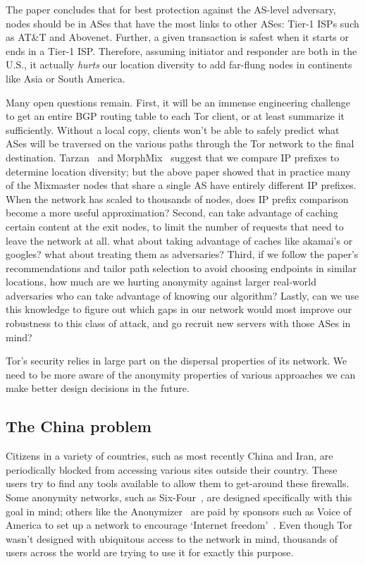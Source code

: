 \documentclass{llncs}
\begin{document}
The paper concludes that for best protection against the AS-level
adversary, nodes should be in ASes that have the most links to other ASes:
Tier-1 ISPs such as AT\&T and Abovenet. Further, a given transaction
is safest when it starts or ends in a Tier-1 ISP. Therefore, assuming
initiator and responder are both in the U.S., it actually \emph{hurts}
our location diversity to add far-flung nodes in continents like Asia
or South America.

Many open questions remain. First, it will be an immense engineering
challenge to get an entire BGP routing table to each Tor client, or at
least summarize it sufficiently. Without a local copy, clients won't be
able to safely predict what ASes will be traversed on the various paths
through the Tor network to the final destination. Tarzan~\cite{tarzan:ccs02}
and MorphMix~\cite{morphmix:fc04} suggest that we compare IP prefixes to
determine location diversity; but the above paper showed that in practice
many of the Mixmaster nodes that share a single AS have entirely different
IP prefixes. When the network has scaled to thousands of nodes, does IP
prefix comparison become a more useful approximation?
%
Second, can take advantage of caching certain content at the exit nodes, to
limit the number of requests that need to leave the network at all.
what about taking advantage of caches like akamai's or googles? what
about treating them as adversaries?
%
Third, if we follow the paper's recommendations and tailor path selection
to avoid choosing endpoints in similar locations, how much are we hurting
anonymity against larger real-world adversaries who can take advantage
of knowing our algorithm?
%
Lastly, can we use this knowledge to figure out which gaps in our network
would most improve our robustness to this class of attack, and go recruit
new servers with those ASes in mind?

Tor's security relies in large part on the dispersal properties of its
network. We need to be more aware of the anonymity properties of various
approaches we can make better design decisions in the future.

\subsection{The China problem}
\label{subsec:china}

Citizens in a variety of countries, such as most recently China and
Iran, are periodically blocked from accessing various sites outside
their country. These users try to find any tools available to allow
them to get-around these firewalls. Some anonymity networks, such as
Six-Four~\cite{six-four}, are designed specifically with this goal in
mind; others like the Anonymizer~\cite{anonymizer} are paid by sponsors
such as Voice of America to set up a network to encourage `Internet
freedom'~\cite{voice-of-america-anonymizer}. Even though Tor wasn't
designed with ubiquitous access to the network in mind, thousands of
users across the world are trying to use it for exactly this purpose.
\end{document}
